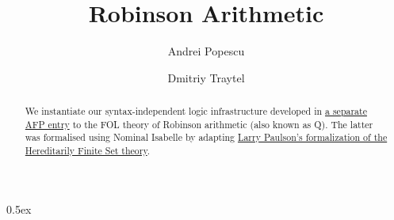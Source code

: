 \documentclass[10pt,a4paper]{article}
\begin{document}
\title{Robinson Arithmetic}
\author{Andrei Popescu \and Dmitriy Traytel}

\maketitle

\begin{abstract} We instantiate our syntax-independent logic infrastructure developed in
\href{https://www.isa-afp.org/entries/Syntax_Independent_Logic.html}{a separate AFP entry} to the FOL theory
of Robinson arithmetic (also known as Q). The latter was formalised using Nominal Isabelle by adapting \href{https://www.isa-afp.org/entries/Incompleteness.html}{Larry
Paulson’s formalization of the Hereditarily Finite Set theory}.
\end{abstract}

\tableofcontents

\parindent 0pt\parskip 0.5ex


\end{document}
